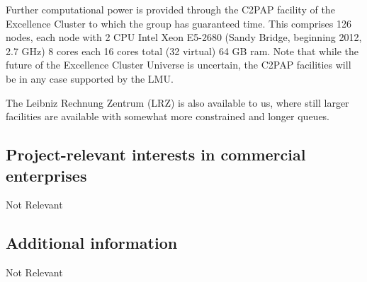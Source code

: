 \documentclass[10pt,fleqn,twoside]{article}
\newcommand{\Tcol}{\color{blue}}
\begin{document}
Further computational power is provided through the C2PAP facility of the Excellence Cluster to which
the group has guaranteed time. This comprises 126 nodes, each node with 2 CPU Intel Xeon E5-2680 (Sandy
Bridge, beginning 2012, 2.7 GHz) 8 cores each 16 cores total (32
virtual) 64 GB ram. Note that while the future of the Excellence
Cluster Universe is uncertain, the C2PAP facilities will be in any
case supported by the LMU. 

The Leibniz Rechnung Zentrum (LRZ) is also available to us, where still
larger facilities are available with somewhat more constrained and longer queues.

\subsection{\Tcol Project-relevant interests in commercial enterprises}

Not Relevant


\subsection{\Tcol Additional information}

Not Relevant
\end{document}
